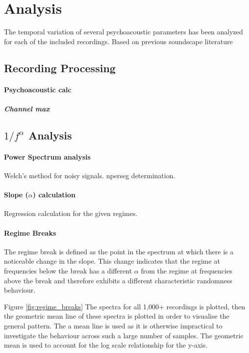 \section{Analysis}
The temporal variation of several psychoacoustic parameters has been analyzed for each of the included recordings. Based on previous soundscape literature \citep{yang}

\subsection{Recording Processing}
\paragraph{Psychoacoustic calc}

\subparagraph{Channel max}

\subsection{$1/f^\alpha$ Analysis}
\paragraph{Power Spectrum analysis} Welch's method for noisy signals. nperseg determination.
\paragraph{Slope ($\alpha$) calculation} Regression calculation for the given regimes.

\paragraph{Regime Breaks}

The regime break is defined as the point in the spectrum at which there is a noticeable change in the slope. This change indicates that the regime at frequencies below the break has a different $\alpha$ from the regime at frequencies above the break and therefore exhibits a different characteristic randomness behaviour.

Figure \ref{fig:regime_breaks} The spectra for all 1,000+ recordings is plotted, then the geometric mean line of these spectra is plotted in order to visualise the general pattern. The a mean line is used as it is otherwise impractical to investigate the behaviour across such a large number of samples. The geometric mean is used to account for the log scale relationship for the y-axis.



